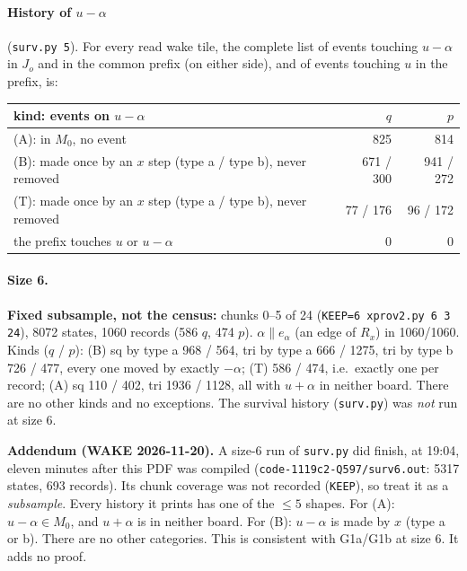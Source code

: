 \documentclass[11pt]{article}
\theoremstyle{definition}\newtheorem{definition}[theorem]{Definition}\newtheorem{remark}[theorem]{Remark}
\begin{document}
\paragraph{History of $u-\alpha$} (\texttt{surv.py 5}). For every read wake tile, the complete list of events touching $u-\alpha$ in $J_o$ and in the common prefix (on either side), and of events touching $u$ in the prefix, is:
\begin{center}\begin{tabular}{lrr}\toprule
kind: events on $u-\alpha$ & $q$ & $p$\\\midrule
(A): in $M_0$, no event & 825 & 814\\
(B): made once by an $x$ step (type a / type b), never removed & 671 / 300 & 941 / 272\\
(T): made once by an $x$ step (type a / type b), never removed & 77 / 176 & 96 / 172\\
the prefix touches $u$ or $u-\alpha$ & 0 & 0\\\bottomrule
\end{tabular}\end{center}

\paragraph{Size 6.} \textbf{Fixed subsample, not the census:} chunks 0--5 of 24 (\texttt{KEEP=6 xprov2.py 6 3 24}), 8072 states, 1060 records (586 $q$, 474 $p$).
$\alpha\parallel e_\alpha$ (an edge of $R_x$) in 1060/1060. Kinds ($q$ / $p$): (B) sq by type a 968 / 564, tri by type a 666 / 1275, tri by type b 726 / 477, every one moved by exactly $-\alpha$;
(T) 586 / 474, i.e.\ exactly one per record; (A) sq 110 / 402, tri 1936 / 1128, all with $u+\alpha$ in neither board. There are no other kinds and no exceptions.
The survival history (\texttt{surv.py}) was \emph{not} run at size 6.

\noindent\textbf{Addendum (WAKE 2026-11-20).} A size-6 run of \texttt{surv.py} did finish, at 19:04, eleven minutes after this PDF was compiled (\texttt{code-1119c2-Q597/surv6.out}: 5317 states, 693 records). Its chunk coverage was not recorded (\texttt{KEEP}), so treat it as a \emph{subsample}. Every history it prints has one of the $\le5$ shapes. For (A): $u-\alpha\in M_0$, and $u+\alpha$ is in neither board. For (B): $u-\alpha$ is made by $x$ (type a or b). There are no other categories. This is consistent with G1a/G1b at size 6. It adds no proof.
\end{document}
